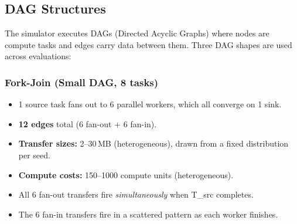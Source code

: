 \documentclass[11pt]{article}
\begin{document}
\subsection{DAG Structures}

The simulator executes DAGs (Directed Acyclic Graphs) where nodes are
compute tasks and edges carry data between them.  Three DAG shapes are
used across evaluations:

\subsubsection{Fork-Join (Small DAG, 8 tasks)}

\begin{center}
\end{center}

\begin{itemize}
  \item 1 source task fans out to 6 parallel workers, which all converge on 1 sink.
  \item \textbf{12 edges} total (6 fan-out + 6 fan-in).
  \item \textbf{Transfer sizes:} 2--30\,MB (heterogeneous), drawn from a fixed distribution per seed.
  \item \textbf{Compute costs:} 150--1000 compute units (heterogeneous).
  \item All 6 fan-out transfers fire \emph{simultaneously} when T\_src completes.
  \item The 6 fan-in transfers fire in a scattered pattern as each worker finishes.
\end{itemize}
\end{document}
